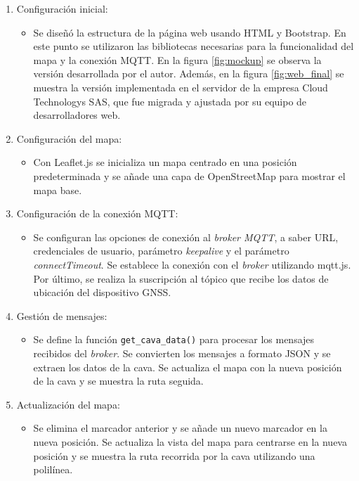 \begin{enumerate}
	\item Configuración inicial:
		\begin{itemize}
		\item Se diseñó la estructura de la página web usando HTML y Bootstrap. En este punto se utilizaron las bibliotecas necesarias para la funcionalidad del mapa y la conexión MQTT. En la figura \ref{fig:mockup} se observa la versión desarrollada por el autor. Además, en la figura \ref{fig:web_final} se muestra la versión implementada en el servidor de la empresa Cloud Technologys SAS, que fue migrada y ajustada por su equipo de desarrolladores web.
		\end{itemize}

	\item Configuración del mapa:
		\begin{itemize}
		\item Con Leaflet.js se inicializa un mapa centrado en una posición predeterminada y se añade una capa de OpenStreetMap para mostrar el mapa base.
		\end{itemize}
		
	\item Configuración de la conexión MQTT:
		\begin{itemize}
		\item Se configuran las opciones de conexión al \textit{broker MQTT}, a saber URL, credenciales de usuario, parámetro \textit{keepalive} y el parámetro \textit{connectTimeout}. Se establece la conexión con el \textit{broker} utilizando mqtt.js. Por último, se realiza la suscripción  al tópico que recibe los datos de ubicación del dispositivo GNSS.
		\end{itemize}
	
	\item Gestión de mensajes:
		\begin{itemize}
		\item Se define la función \verb|get_cava_data()| para procesar los mensajes recibidos del \textit{broker}. Se convierten los mensajes a formato JSON y se extraen los datos de la cava. Se actualiza el mapa con la nueva posición de la cava y se muestra la ruta seguida.
		\end{itemize}
		
	\item Actualización del mapa:
		\begin{itemize}
		\item Se elimina el marcador anterior y se añade un nuevo marcador en la nueva posición. Se actualiza la vista del mapa para centrarse en la nueva posición y se muestra la ruta recorrida por la cava utilizando una polilínea.
		\end{itemize}

\end{enumerate}


